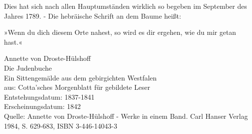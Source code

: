 Dies hat sich nach allen Hauptumständen wirklich so begeben im September des Jahres 1789. - Die hebräische Schrift an dem Baume heißt:

»Wenn du dich diesem Orte nahest, so wird es dir ergehen, wie du mir getan hast.«

Annette von Droste-Hülshoff \\
Die Judenbuche\\
Ein Sittengemälde aus dem gebirgichten Westfalen \\
aus: Cotta’sches Morgenblatt für gebildete Leser \\
Entstehungsdatum: 1837-1841 \\
Erscheinungsdatum: 1842 \\
Quelle: Annette von Droste-Hülshoff - Werke in einem Band. Carl Hanser Verlag 1984, S. 629-683, ISBN 3-446-14043-3


\endinput
